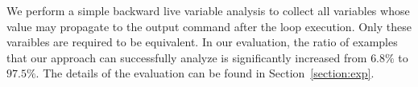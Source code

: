 \documentclass{llncs}
\newcommand{\ite}[3]{
	 \ifmmode
	 \mathbf{if}\ #1 \ \mathbf{then}\ #2\  \mathbf{else}\ #3
	 \else
	 \textbf{if}\ #1 \ \textbf{then}\ #2\  \textbf{else}\ #3
	 \fi}
\begin{document}
We perform a simple backward live variable analysis to collect all variables whose value may propagate to the output command after the loop execution. Only these varaibles are required to be equivalent. In our evaluation, the ratio of examples that our approach can successfully analyze is significantly increased from $6.8\%$ to $97.5\%$. The details of the evaluation can be found in Section~\ref{section:exp}.

% 
 
\end{document}
